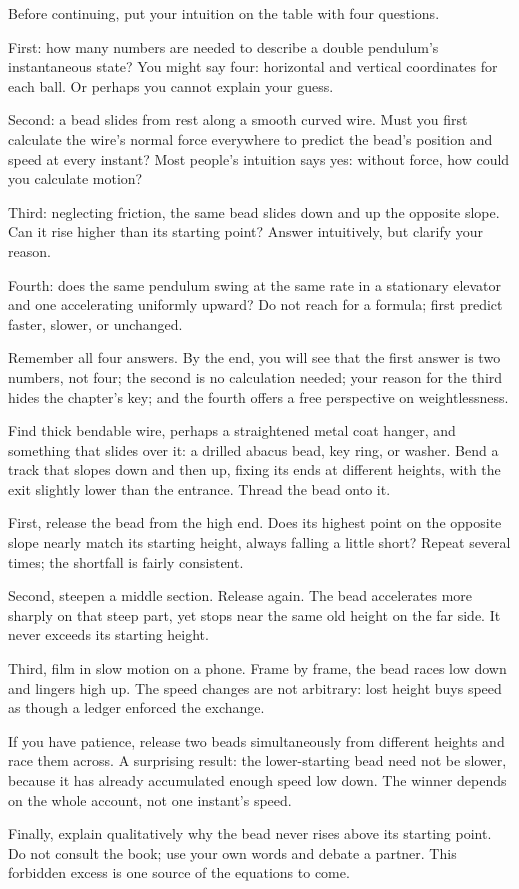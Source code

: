 \begin{mainline}
Before continuing, put your intuition on the table with four questions.

First: how many numbers are needed to describe a double pendulum's instantaneous state? You might say four: horizontal and vertical coordinates for each ball. Or perhaps you cannot explain your guess.

Second: a bead slides from rest along a smooth curved wire. Must you first calculate the wire's normal force everywhere to predict the bead's position and speed at every instant? Most people's intuition says yes: without force, how could you calculate motion?

Third: neglecting friction, the same bead slides down and up the opposite slope. Can it rise higher than its starting point? Answer intuitively, but clarify your reason.

Fourth: does the same pendulum swing at the same rate in a stationary elevator and one accelerating uniformly upward? Do not reach for a formula; first predict faster, slower, or unchanged.

Remember all four answers. By the end, you will see that the first answer is two numbers, not four; the second is no calculation needed; your reason for the third hides the chapter's key; and the fourth offers a free perspective on weightlessness.
\end{mainline}


\begin{experiment}
Find thick bendable wire, perhaps a straightened metal coat hanger, and something that slides over it: a drilled abacus bead, key ring, or washer. Bend a track that slopes down and then up, fixing its ends at different heights, with the exit slightly lower than the entrance. Thread the bead onto it.

First, release the bead from the high end. Does its highest point on the opposite slope nearly match its starting height, always falling a little short? Repeat several times; the shortfall is fairly consistent.

Second, steepen a middle section. Release again. The bead accelerates more sharply on that steep part, yet stops near the same old height on the far side. It never exceeds its starting height.

Third, film in slow motion on a phone. Frame by frame, the bead races low down and lingers high up. The speed changes are not arbitrary: lost height buys speed as though a ledger enforced the exchange.

If you have patience, release two beads simultaneously from different heights and race them across. A surprising result: the lower-starting bead need not be slower, because it has already accumulated enough speed low down. The winner depends on the whole account, not one instant's speed.

Finally, explain qualitatively why the bead never rises above its starting point. Do not consult the book; use your own words and debate a partner. This forbidden excess is one source of the equations to come.
\end{experiment}

